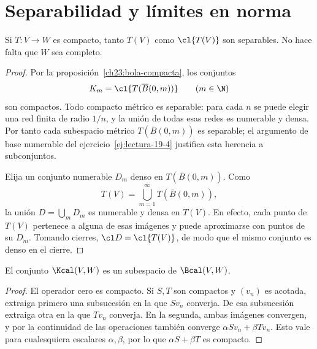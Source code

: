 \section{Separabilidad y límites en norma}

\begin{teorema}\label{ch23:separable}
Si $T:V\to W$ es compacto, tanto $T(V)$ como $\cl{T(V)}$ son separables. No hace falta que $W$ sea completo.
\end{teorema}
\begin{proof}
Por la proposición~\ref{ch23:bola-compacta}, los conjuntos
\[
 K_m=\cl{T(\overline B(0,m))}\qquad(m\in\N)
\]
son compactos. Todo compacto métrico es separable: para cada $n$ se puede elegir una red finita de radio $1/n$, y la unión de todas esas redes es numerable y densa. Por tanto cada subespacio métrico $T(\overline B(0,m))$ es separable; el argumento de base numerable del ejercicio~\ref{ej:lectura-19-4} justifica esta herencia a subconjuntos.

Elija un conjunto numerable $D_m$ denso en $T(\overline B(0,m))$. Como
\[
 T(V)=\bigcup_{m=1}^{\infty}T(\overline B(0,m)),
\]
la unión $D=\bigcup_mD_m$ es numerable y densa en $T(V)$. En efecto, cada punto de $T(V)$ pertenece a alguna de esas imágenes y puede aproximarse con puntos de su $D_m$. Tomando cierres, $\cl D=\cl{T(V)}$, de modo que el mismo conjunto es denso en el cierre.
\end{proof}

\begin{proposicion}
El conjunto $\Kcal(V,W)$ es un subespacio de $\Bcal(V,W)$.
\end{proposicion}
\begin{proof}
El operador cero es compacto. Si $S,T$ son compactos y $(v_n)$ es acotada, extraiga primero una subsucesión en la que $Sv_n$ converja. De esa subsucesión extraiga otra en la que $Tv_n$ converja. En la segunda, ambas imágenes convergen, y por la continuidad de las operaciones también converge $\alpha Sv_n+\beta Tv_n$. Esto vale para cualesquiera escalares $\alpha,\beta$, por lo que $\alpha S+\beta T$ es compacto.
\end{proof}

